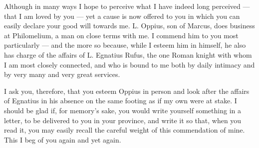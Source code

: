 

 Although in many ways I hope to perceive what I have indeed long perceived --- that I am loved by you --- yet a cause is now offered to you in which you can easily declare your good will towards me. L. Oppius, son of Marcus, does business at Philomelium, a man on close terms with me. I commend him to you most particularly --- and the more so because, while I esteem him in himself, he also has charge of the affairs of L. Egnatius Rufus, the one Roman knight with whom I am most closely connected, and who is bound to me both by daily intimacy and by very many and very great services.

 I ask you, therefore, that you esteem Oppius in person and look after the affairs of Egnatius in his absence on the same footing as if my own were at stake. I should be glad if, for memory's sake, you would write yourself something in a letter, to be delivered to you in your province, and write it so that, when you read it, you may easily recall the careful weight of this commendation of mine. This I beg of you again and yet again.
